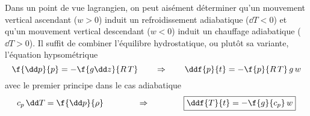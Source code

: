 \sk
Dans un point de vue lagrangien, on peut aisément déterminer
qu'un mouvement vertical ascendant ($w>0$) induit un refroidissement adiabatique ($\dd T<0$)
et qu'un mouvement vertical descendant ($w<0$) induit un chauffage adiabatique ($\dd T>0$).
Il suffit de combiner l'équilibre hydrostatique,
ou plutôt sa variante, l'équation hypsométrique
\[ 
\f{\dd p}{p} = -\f{g \dd z}{R\,T} 
\qquad  
\Rightarrow
\qquad
\ddf{p}{t} = - \f{p}{R\,T} \, g \, w
\]
\noindent avec le premier principe dans le cas
adiabatique %
\[
c_p \, \dd T = \f{\dd p}{\rho} \qquad\qquad \Rightarrow \qquad\qquad \boxed{\ddf{T}{t} = - \f{g}{c_p} \, w}
\]

